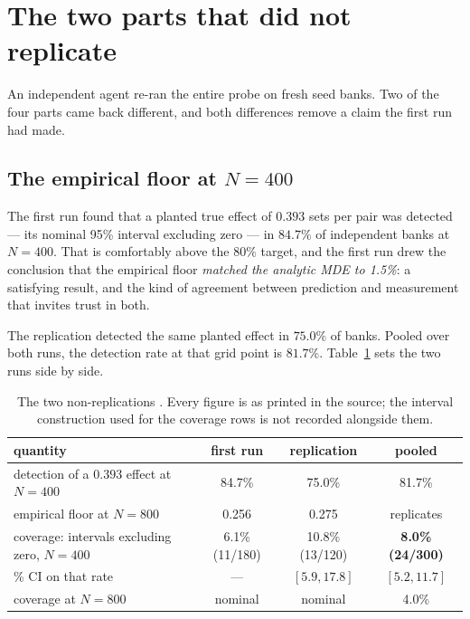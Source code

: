 \documentclass[11pt]{article}
\begin{document}
\section{The two parts that did not replicate}
\label{sec:nonrep}

An independent agent re-ran the entire probe on fresh seed banks. Two of the four parts came back
different, and both differences remove a claim the first run had made.

\subsection{The empirical floor at \texorpdfstring{$N=400$}{N=400}}
\label{sec:floor400}

The first run found that a planted true effect of $0.393$ sets per pair was detected --- its nominal
95\% interval excluding zero --- in $84.7\%$ of independent banks at $N=400$. That is comfortably
above the $80\%$ target, and the first run drew the conclusion that the empirical floor
\emph{matched the analytic MDE to 1.5\%}: a satisfying result, and the kind of agreement between
prediction and measurement that invites trust in both.

The replication detected the same planted effect in $75.0\%$ of banks. Pooled over both runs, the
detection rate at that grid point is $81.7\%$. Table~\ref{tab:nonrep} sets the two runs side by
side.

\begin{table}[ht]
\centering
\caption{The two non-replications \cite{concession}. Every figure is as printed in the source; the
interval construction used for the coverage rows is not recorded alongside them.}
\label{tab:nonrep}
\small
\begin{tabular}{lccc}
\toprule
quantity & first run & replication & pooled \\
\midrule
detection of a $0.393$ effect at $N=400$ & 84.7\% & 75.0\% & 81.7\% \\
empirical floor at $N=800$ & 0.256 & 0.275 & replicates \\
coverage: intervals excluding zero, $N=400$ & 6.1\% (11/180) & 10.8\% (13/120) & \textbf{8.0\% (24/300)} \\
\quad 95\% CI on that rate & --- & $[5.9, 17.8]$ & $[5.2, 11.7]$ \\
coverage at $N=800$ & nominal & nominal & 4.0\% \\
\bottomrule
\end{tabular}
\end{table}
\end{document}
